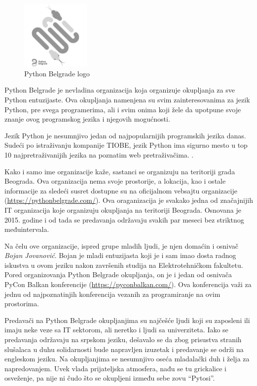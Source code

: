 \documentclass[a4paper]{article}
\begin{document}
{\begin{figure}[h!]
  \centering
  \includegraphics[width=0.3\textwidth]{pybgd.png}
  \caption{Python Belgrade logo}
\end{figure}

Python Belgrade je nevladina organizacija koja organizuje okupljanja za sve Python entuzijaste. Ova okupljanja namenjena su svim
zainteresovanima za jezik Python, pre svega programerima, ali i svim onima koji žele da upotpune svoje znanje ovog programskog jezika i njegovih mogućnosti.

Jezik Python je nesumnjivo jedan od najpopularnijih programskih jezika danas. Sudeći po istraživanju kompanije TIOBE, jezik Python ima sigurno mesto u top 10 najpretraživanijih jezika na poznatim web pretraživačima. \cite{pythonPopular}.

Kako i samo ime organizacije kaže, sastanci se organizuju na teritoriji grada Beograda. Ova organizacija nema svoje prostorije, a lokacija, kao i ostale informacije
za sledeći susret dostupne su na oficijalnom vebsajtu organizacije (\url{https://pythonbelgrade.com/}). Ova oraganizacija je svakako jedna od značajnijih IT organizacija koje organizuju okupljanja na teritoriji Beograda. Osnovana je 2015. godine i od tada se predavanja održavaju svakih par meseci bez striktnog međuintervala. 

Na čelu ove organizacije, ispred grupe mladih ljudi, je njen domaćin i osnivač \textit{Bojan Jovanović}. Bojan je mladi entuzijasta koji je i sam imao dosta radnog iskustva u ovom jeziku nakon završenih studija na
Elektrotehničkom fakultetu. Pored organizovanja Python Belgrade okupljanja, on je i jedan od osnivača PyCon Balkan konferencije (\url{https://pyconbalkan.com/}). Ova konferencija važi za jednu od najpoznatinjih konferencija vezanih za programiranje na ovim prostorima.

Predavači na Python Belgrade okupljanjima su najčešće ljudi koji su zaposleni ili imaju neke veze sa IT sektorom, ali neretko i ljudi sa univerziteta. \cite{pybgdSpeakers} Iako se predavanja održavaju na srpskom jeziku, dešavalo se da zbog prisustva stranih slušalaca u duhu solidarnosti bude napravljen izuzetak i predavanje se održi na engleskom jeziku. Na okupljanjima se nesumnjivo oseća mladalački duh i želja za napredovanjem. Uvek vlada prijateljska atmosfera, nađu se tu grickalice i osveženje, pa nije ni čudo što se okupljeni između sebe zovu ``Pytosi''.

}
\end{document}
